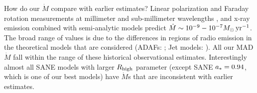 

How do our $\dot{M}$ compare with earlier estimates?  Linear polarization and Faraday rotation measurements at millimeter and sub-millimeter wavelengths \citep{2000ApJ...538L.121A, 2000ApJ...545..842Q, 2003ApJ...588..331B, 2006ApJ...640..308M, 2006JPhCS..54..354M, 2006ApJ...646L.111M}, and x-ray emission \citep{2003ApJ...591..891B, doi:10.1126/science.1240755} combined  with semi-analytic models predict $\dot{M} \sim 10^{-9} - 10^{-7} M_{\odot}\,\mathrm{yr}^{-1}$.  The broad range of values is due to the differences in regions of radio emission in the theoretical models that are considered (ADAFs: \citealt{1998ApJ...492..554N, Yuan_2003}; Jet models: \citealt{1993A&A...278L...1F, 2000A&A...362..113F}).  All our MAD $\dot{M}$ fall within the range of these historical observational estimates. Interestingly almost all SANE models with larger $R_\mathrm{high}$ parameter (except SANE $a_*=0.94$, which is one of our best models) have $\dot{M}$s that are inconsistent with earlier estimates.


